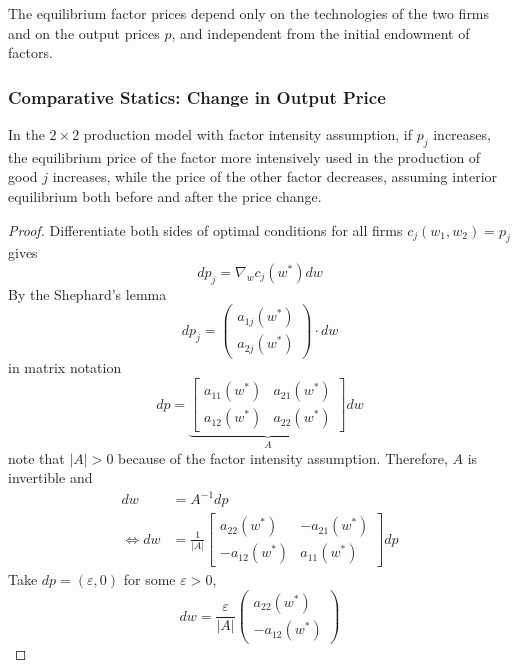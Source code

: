 \documentclass{report}
\begin{document}
			\begin{remark}
				The equilibrium factor prices depend only on the technologies of the two firms and on the output prices $p$, and independent from the initial endowment of factors.
			\end{remark}
			
			\subsubsection{Comparative Statics: Change in Output Price}
			\begin{theorem}
				In the $2 \times 2$ production model with factor intensity assumption, if $p_j$ increases, the equilibrium price of the factor more intensively used in the production of good $j$ increases, while the price of the other factor decreases, assuming interior equilibrium both before and after the price change.
			\end{theorem}
			
			\begin{proof}
				Differentiate both sides of optimal conditions for all firms $c_j(w_1, w_2) = p_j$ gives
				\begin{equation}
					d p_j = \nabla_w c_j(w^*) dw
				\end{equation}
				By the Shephard's lemma
				\begin{equation}
					dp_j = \begin{pmatrix}a_{1j}(w^*)\\ a_{2j}(w^*)\end{pmatrix} \cdot dw
				\end{equation}
				in matrix notation
				\begin{equation}
					d p=\underbrace{
					\left[ \begin{array}{ll}{a_{11}\left(w^{*}\right)} & {a_{21}\left(w^{*}\right)} \\ {a_{12}\left(w^{*}\right)} & {a_{22}\left(w^{*}\right)}\end{array}\right]
					}_{A}
					 d w
				\end{equation}
				note that $|A| > 0$ because of the factor intensity assumption. Therefore, $A$ is invertible and 
				\begin{align}
					dw &= A^{-1} dp \\
					\iff dw &= \frac{1}{|A|} \left[ \begin{array}{cc}{a_{22}\left(w^{*}\right)} & {-a_{21}\left(w^{*}\right)} \\ {-a_{12}\left(w^{*}\right)} & {a_{11}\left(w^{*}\right)}\end{array}\right] dp
				\end{align}
				Take $dp = (\varepsilon, 0)$ for some $\varepsilon > 0$, 
				\begin{equation}
					dw = \frac{\varepsilon}{|A|} 
					\begin{pmatrix}
						a_{22}(w^*)\\
						-a_{12}(w^*)
					\end{pmatrix}
				\end{equation}
			\end{proof}
			
\end{document}
